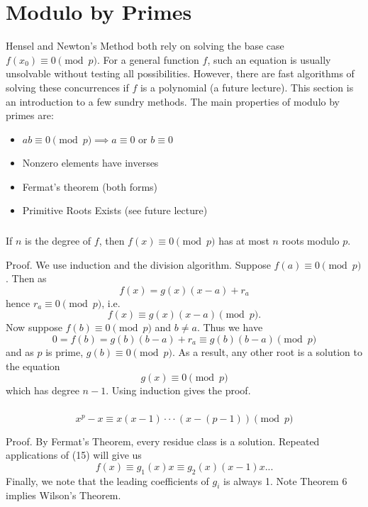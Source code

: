 \documentclass{article}
\begin{document}
\section{Modulo by Primes}
Hensel and Newton's Method both rely on solving the base case $f(x_{0}) \equiv 0 \pmod{p}$. For a general function $f$, such an equation is usually unsolvable without testing all possibilities. However, there are fast algorithms of solving these concurrences if $f$ is a polynomial (a future lecture). This section is an introduction to a few sundry methods. The main properties of modulo by primes are: 
\begin{itemize}
    \item $ab \equiv 0 \pmod{p} \implies a \equiv 0$ or $b \equiv 0$ 
    \item Nonzero elements have inverses
    \item Fermat's theorem (both forms)
    \item Primitive Roots Exists (see future lecture)
\end{itemize}

\subsubsection{}
\begin{thm}
    If $n$ is the degree of $f$, then $f(x) \equiv 0 \pmod{p}$ has at most $n$ roots modulo $p$.
\end{thm}
Proof. We use induction and the division algorithm. Suppose $f(a) \equiv 0 \pmod{p}$. Then as
\begin{equation}
    f(x) = g(x)(x-a) + r_{a}
\end{equation}
hence $r_{a} \equiv 0 \pmod{p}$, i.e.
\begin{equation}
    f(x) \equiv g(x)(x-a) \pmod{p}.
\end{equation}
Now suppose $f(b) \equiv 0 \pmod{p}$ and $b \neq a$. Thus we have
\begin{equation}
    0 = f(b) = g(b)(b-a) + r_{a} \equiv g(b)(b-a) \pmod{p}
\end{equation}
and as $p$ is prime, $g(b) \equiv 0 \pmod{p}$. As a result, any other root is a solution to the equation
\begin{equation}
    g(x) \equiv 0 \pmod{p}
\end{equation}
which has degree $n-1$. Using induction gives the proof.

\subsubsection{}
\begin{thm}
    \begin{equation}
        x^{p}-x \equiv x(x-1)\cdot \cdot \cdot (x-(p-1)) \pmod{p}
    \end{equation}
\end{thm}
Proof. By Fermat's Theorem, every residue class is a solution. Repeated applications of (15) will give us
\begin{equation}
    f(x) \equiv g_{1}(x)x \equiv g_{2}(x)(x-1)x ...
\end{equation}
Finally, we note that the leading coefficients of $g_{i}$ is always 1.
Note Theorem 6 implies Wilson's Theorem.
\end{document}
